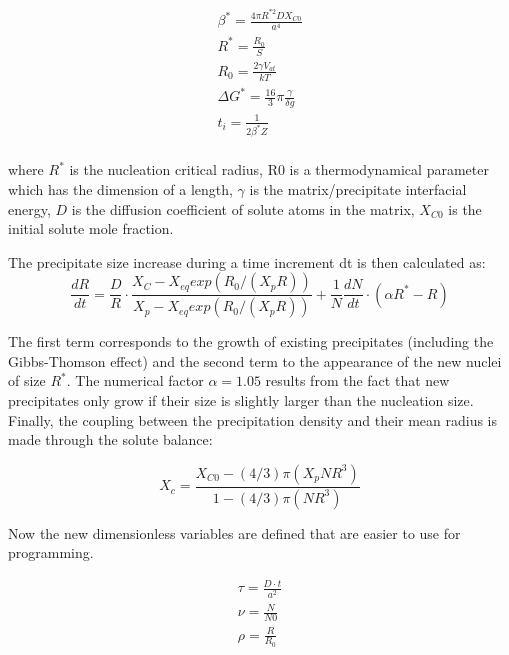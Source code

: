 \documentclass[12pt,a4paper]{article}
\begin{document}
\begin{subequations}
	\begin{align}
\beta^* = \frac{4\pi R^{*2} D X_{C0}}{a^4} \\
R^* = \frac{R_0}{S} \\
R_0 = \frac{2\gamma V_{at}}{kT} \\
\Delta G^* = \frac{16}{3}\pi \frac{\gamma}{\delta g} \\
t_i = \frac{1}{2\beta^* Z} \\
	\end{align}	
\end{subequations}

where $R^*$ is the nucleation critical radius, R0 is a thermodynamical parameter
which has the dimension of a length, $\gamma$ is the matrix/precipitate interfacial energy, $D$ is the diffusion coefficient of solute atoms in the matrix, $X_{C0}$ is the initial solute mole fraction.

The precipitate size increase during a time increment dt is then calculated as:
\begin{equation}
\label{P_radius}
\frac{dR}{dt} = \frac{D}{R} \cdot \frac{X_C - X_{eq} exp(R_0/(X_pR))}{X_p - X_{eq} exp(R_0/(X_pR))} + \frac{1}{N}\frac{dN}{dt} \cdot (\alpha R^* - R)
\end{equation}

The first term corresponds to the growth of existing precipitates (including the Gibbs-Thomson effect) and the second term to the appearance of the new nuclei of
size $R^*$. The numerical factor $\alpha = 1.05$ results from the fact that new precipitates only grow if their size is slightly larger than the nucleation size. 
Finally, the coupling between the precipitation density and their mean radius is made through the solute balance:

\begin{equation}
X_c = \frac{X_{C0}-(4/3)\pi (X_pNR^3)}{1-(4/3)\pi (NR^3)}
\end{equation}

Now the new dimensionless variables are defined that are easier to use for programming.

\begin{subequations}
	\begin{align}
\tau = \frac{D\cdot t}{a^2} \\
\nu = \frac{N}{N0} \\
\rho = \frac{R}{R_0}\\
	\end{align}
\end{subequations}
\end{document}
